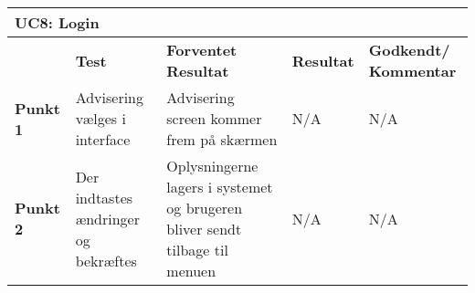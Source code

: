 \begin{table}[htbp] \centering
\begin{tabular}{|p{}|p{}|p{3cm}|p{3cm}|p{3cm}|} %
	\hline
\multicolumn{5}{|l|}{\textbf{UC8: Login}} \\\hline
&\textbf{Test} &\textbf{Forventet \newline Resultat} &\textbf{Resultat} &\textbf{Godkendt/ \newline Kommentar} \\\hline
\textbf{Punkt 1}		&Advisering vælges i interface	&Advisering screen kommer frem på skærmen 	&N/A 	&N/A \\\hline
\textbf{Punkt 2}		&Der indtastes ændringer	og bekræftes		&Oplysningerne lagers i systemet og brugeren bliver sendt tilbage til menuen 	&N/A 	&N/A \\\hline
	\end{tabular}
	\label{ATUC8} 
\end{table}